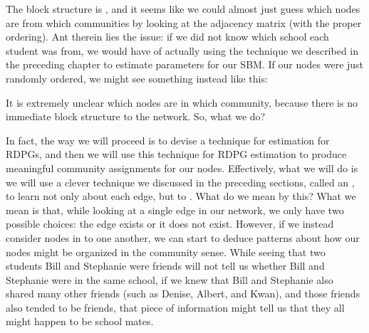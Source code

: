 \documentclass[letterpaper,10pt,english]{jupyterBook}
\begin{document}
\noindent{}

\sphinxAtStartPar
The block structure is , and it seems like we could almost just guess which nodes are from which communities by looking at the adjacency matrix (with the proper ordering). Ant therein lies the issue: if we did not know which school each student was from, we would have  of actually using the technique we described in the preceding chapter to estimate parameters for our SBM. If our nodes were just randomly ordered, we might see something instead like this:

\begin{sphinxVerbatim}[commandchars=\\\{\}]
    

  \PYG{p}{[}\PYG{p}{[}\PYG{p}{]}\PYG{p}{]} \PYG{p}{[}\PYG{p}{]}
\end{sphinxVerbatim}

\noindent{}

\sphinxAtStartPar
It is extremely unclear which nodes are in which community, because there is no immediate block structure to the network. So, what  we do?

\sphinxAtStartPar
In fact, the way we will proceed is to devise a technique for estimation for RDPGs, and then we will use this technique for RDPG estimation to produce meaningful community assignments for our nodes. Effectively, what we will do is we will use a clever technique we discussed in the preceding sections, called an , to learn not only about each edge, but to . What do we mean by this? What we mean is that, while looking at a single edge in our network, we only have two possible choices: the edge exists or it does not exist. However, if we instead consider nodes in  to one another, we can start to deduce patterns about how our nodes might be organized in the community sense. While seeing that two students Bill and Stephanie were friends will not tell us whether Bill and Stephanie were in the same school, if we knew that Bill and Stephanie also shared many other friends (such as Denise, Albert, and Kwan), and those friends also tended to be friends, that piece of information might tell us that they all might happen to be school mates.
\end{document}
